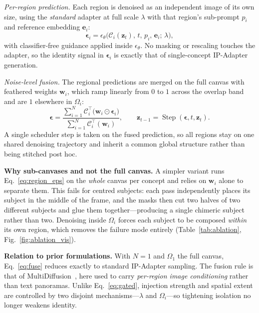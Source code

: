 \documentclass[10pt,twocolumn,letterpaper]{article}
\begin{document}
\noindent\textit{Per-region prediction.}  Each region is denoised as an
independent image of its own size, using the \emph{standard} adapter at
full scale $\lambda$ with that region's sub-prompt $p_i$ and reference
embedding $\mathbf{e}_i$:
\begin{equation}
  \boldsymbol{\epsilon}_i =
    \epsilon_\theta\!\bigl(\mathcal{C}_i(\mathbf{z}_t),\,t,\,p_i,\,
    \mathbf{e}_i;\,\lambda\bigr),
  \label{eq:region_eps}
\end{equation}
with classifier-free guidance applied inside $\epsilon_\theta$.  No
masking or rescaling touches the adapter, so the identity signal in
$\boldsymbol{\epsilon}_i$ is exactly that of single-concept
IP-Adapter generation.

\noindent\textit{Noise-level fusion.}  The regional predictions are
merged on the full canvas with feathered weights $\mathbf{w}_i$, which
ramp linearly from $0$ to $1$ across the overlap band and are $1$
elsewhere in $\Omega_i$:
\begin{equation}
  \boldsymbol{\epsilon} =
  \frac{\sum_{i=1}^{N}\mathcal{C}_i^{\!\top}
        \bigl(\mathbf{w}_i\odot\boldsymbol{\epsilon}_i\bigr)}
       {\sum_{i=1}^{N}\mathcal{C}_i^{\!\top}(\mathbf{w}_i)},
  \qquad
  \mathbf{z}_{t-1}=\operatorname{Step}(\boldsymbol{\epsilon},t,\mathbf{z}_t).
  \label{eq:fuse}
\end{equation}
A single scheduler step is taken on the fused prediction, so all
regions stay on one shared denoising trajectory and inherit a common
global structure rather than being stitched post hoc.

\noindent\textbf{Why sub-canvases and not the full canvas.}
A simpler variant runs Eq.~\ref{eq:region_eps} on the \emph{whole}
canvas per concept and relies on $\mathbf{w}_i$ alone to separate them.
This fails for centred subjects: each pass independently places its
subject in the middle of the frame, and the masks then cut two halves
of two different subjects and glue them together---producing a single
chimeric subject rather than two.  Denoising inside $\Omega_i$ forces
each subject to be composed \emph{within} its own region, which removes
the failure mode entirely (Table~\ref{tab:ablation},
Fig.~\ref{fig:ablation_vis}).

\noindent\textbf{Relation to prior formulations.}
With $N{=}1$ and $\Omega_1$ the full canvas, Eq.~\ref{eq:fuse} reduces
exactly to standard IP-Adapter sampling.  The fusion rule is that of
MultiDiffusion~\cite{bartal2023multidiffusion}, here used to carry
\emph{per-region image conditioning} rather than text panoramas.
Unlike Eq.~\ref{eq:gated}, injection strength and spatial extent are
controlled by two disjoint mechanisms---$\lambda$ and $\Omega_i$---so
tightening isolation no longer weakens identity.
\end{document}
